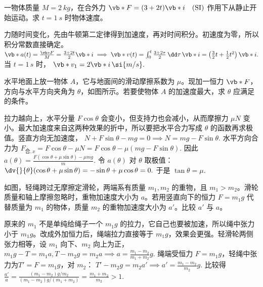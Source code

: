 \begin{exercise}
一物体质量 \(M=\SI{2}{kg}\)，在合外力
 \(\vb*{F}=(3+2t)\vb*{i}\quad(\mathrm{SI})\) 
作用下从静止开始运动。求 \(t=\SI{1}{s}\) 时物体速度。
\end{exercise}
\begin{solution}
力随时间变化，先由牛顿第二定律得到加速度，再对时间积分。初速度为零，所以积分常数直接确定。
 \(\vb*{a}(t)=\frac{\vb*{F}}{M} =\frac{3+2t}{2}\vb*{i}\implies \vb*{v}(t)=\int_0^t \frac{3+2\tau}{2}\,\dd\tau\,\vb*{i} =\left(\frac32t+\frac12t^2\right)\vb*{i}.\) 
当 \(t=1\,\si{s}\) 时，
 \(\vb*{v}_1=2\vb*{i}\,\si{m/s}.\) 
\end{solution}


\begin{exercise}
水平地面上放一物体 \(A\)，它与地面间的滑动摩擦系数为 \(\mu\)。现加一恒力 \(\vb*{F}\)，方向与水平方向夹角为 \(\theta\)，如图所示。若要使物体 \(A\) 的加速度最大，求 \(\theta\) 应满足的条件。
\end{exercise}
\begin{solution}
拉力越向上，水平分量 \(F\cos\theta\) 会变小，但支持力也会减小，从而摩擦力 \(\mu N\) 变小。最大加速度来自这两种效果的折中，所以要把水平合力写成 \(\theta\) 的函数再求极值。竖直方向无加速度，
 \(N+F\sin\theta-mg=0 \implies N=mg-F\sin\theta.\) 
水平方向合力为
 \(F_{\text{合},x}=F\cos\theta-\mu N =F\cos\theta-\mu(mg-F\sin\theta).\) 
因此
 \(a(\theta)=\frac{F(\cos\theta+\mu\sin\theta)-\mu mg}{m}.\) 
令 \(a(\theta)\) 对 \(\theta\) 取极值：
 \(\dv{}{\theta}(\cos\theta+\mu\sin\theta) =-\sin\theta+\mu\cos\theta=0.\) 
于是
 \(\tan\theta=\mu.\) 
\end{solution}

\begin{exercise}
如图，轻绳跨过无摩擦定滑轮，两端系有质量 \(m_1,m_2\) 的重物，且 \(m_1>m_2\)。滑轮质量和轴上摩擦忽略时，重物加速度大小为 \(a\)。若用竖直向下的恒力 \(F=m_1g\) 代替质量为 \(m_1\) 的物体，质量 \(m_2\) 的重物加速度大小为 \(a'\)。比较 \(a'\) 与 \(a\)。
\end{exercise}
\begin{solution}
 原来的 \(m_1\) 不是单纯给绳子一个 \(m_1g\) 的拉力，它自己也要被加速，所以绳中张力小于 \(m_1g\)。改成外加恒力后，绳端拉力直接等于 \(m_1g\)，效果会更强。轻滑轮两侧张力相等，设 \(m_1\) 向下、\(m_2\) 向上为正，
 \(m_1g-T=m_1a, T-m_2g=m_2a\implies a=\frac{m_1-m_2}{m_1+m_2}g.\) 
绳端受恒力 \(F=m_1g\)，轻绳中张力为$T'=F=m_1g$，对 \(m_2\)：
 \(T'-m_2g=m_2a' \implies a'=\frac{m_1-m_2}{m_2}g.\) 
比较得
 \(\frac{a'}{a} =\frac{(m_1-m_2)g/m_2}{(m_1-m_2)g/(m_1+m_2)} =\frac{m_1+m_2}{m_2}>1.\) 
\end{solution}


